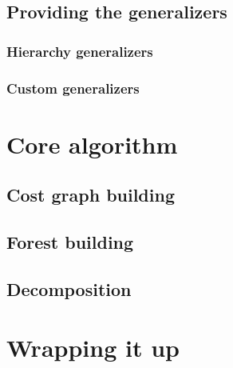 \subsection{Providing the generalizers}

\subsubsection{Hierarchy generalizers}

\subsubsection{Custom generalizers}

\section{Core algorithm}

\subsection{Cost graph building}

\subsection{Forest building}

\subsection{Decomposition}

\section{Wrapping it up}